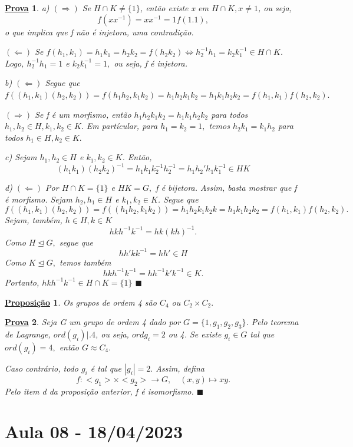 \documentclass{article}
\newtheorem*{prop*}{\underline{Proposi\c c\~ao}}
\newtheorem*{proof*}{\underline{Prova}}
\renewcommand\qedsymbol{$\blacksquare$}
\begin{document}
\begin{proof*}
  a) $(\Rightarrow)$ Se $H\cap{K}\neq\{1\}$, ent\~ao existe x em $H\cap{K}, x\neq 1$, ou seja, 
    $$
      f(xx^{-1}) = xx^{-1} = 1 f(1.1),
    $$
    o que implica que f n\~ao \'e injetora, uma contradi\c c\~ao.

    $(\Leftarrow)$ Se $f(h_{1},k_{1})=h_{1}k_{1}=h_{2}k_{2} = f(h_{2}k_{2}) \Longleftrightarrow h_{2}^{-1}h_{1} = k_{2}k_{1}^{-1}\in H\cap K$. Logo,
    $h_{2}^{-1}h_{1} = 1$ e $k_{2}k_{1}^{-1} = 1,$ ou seja, f \'e injetora.

  b) $(\Leftarrow)$ Segue que $f((h_{1},k_{1})(h_{2},k_{2})) = f(h_{1}h_{2}, k_{1}k_{2}) = h_{1}h_{2}k_{1}k_{2} = h_{1}k_{1}h_{2}k_{2} =
f(h_{1}, k_{1})f(h_{2},k_{2}).$

    $(\Rightarrow)$ Se f \'e um morfismo, ent\~ao $h_{1}h_{2}k_{1}k_{2} = h_{1}k_{1}h_{2}k_{2}$ para todos $h_{1},h_{2}\in H, k_{1},k_{2}\in K.$
  Em part\'icular, para $h_{1}=k_{2}=1,$ temos $h_{2}k_{1} = k_{1}h_{2}$ para todos $h_{1}\in H, k_{2}\in K.$

  c) Sejam $h_{1}, h_{2}\in H$ e $k_{1}, k_{2}\in K$. Ent\~ao, 
    $$
    (h_{1}k_{1})(h_{2}k_{2})^{-1} = h_{1}k_{1}k_{2}^{-1}h_{2}^{-1} = h_{1}h_{2}'h_{1}k_{1}^{-1}\in HK
    $$

    d) $(\Leftarrow)$ Por $H\cap K = \{1\}$ e $HK = G,$ f \'e bijetora. Assim, basta mostrar que f \'e morfismo. 
    Sejam $h_{2}, h_{1}\in H$ e $k_{1}, k_{2}\in K$. Segue que 
      $$
        f((h_{1},k_{1})(h_{2}, k_{2})) = f((h_{1}h_{2}, k_{1}k_{2})) = h_{1}h_{2}k_{1}k_{2}k = h_{1}k_{1}h_{2}k_{2} = f(h_{1}, k_{1})f(h_{2}, k_{2}).
      $$
      Sejam, tamb\'em, $h\in H, k\in K$ 
        $$
          hkh^{-1}k^{-1} = hk(kh)^{-1}.
        $$
        Como $H\trianglelefteq{G},$ segue que 
          $$
            hh'kk^{-1} = hh'\in H
          $$
        Como $K\trianglelefteq{G},$ temos tamb\'em 
          $$
            hkh^{-1}k^{-1} = hh^{-1}k'k^{-1}\in K.
          $$
          Portanto, $hkh^{-1}k^{-1}\in H\cap K=\{1\}$ \qedsymbol
\end{proof*}
\begin{prop*}
  Os grupos de ordem 4 s\~ao $C_{4}$ ou $C_{2}\times C_{2}.$
\end{prop*}
\begin{proof*}
  Seja G um grupo de ordem 4 dado por $G=\{1, g_{1}, g_{2}, g_{3}\}$. Pelo teorema de Lagrange, $ord(g_{i})\biggl|_{}^{}\biggr.4$,
ou seja, $ord g_{i} = 2$ ou 4. Se existe $g_{i}\in G$ tal que $ord(g_{i}) = 4,$ ent\~ao $G\approx C_{4}.$

Caso contr\'ario, todo $g_{i}$ \'e tal que $|g_{i}|=2.$ Assim, defina 
  $$
    f:<g_{1}>\times<g_{2}>\rightarrow G,\quad (x,y)\mapsto xy.
  $$
  Pelo item d da proposi\c c\~ao anterior, f \'e isomorfismo. \qedsymbol
\end{proof*}
\newpage

\section{Aula 08 - 18/04/2023}
\end{document}
